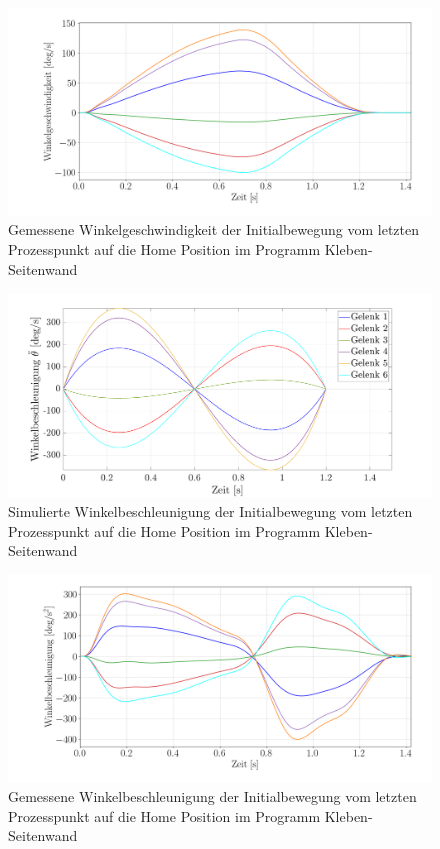 %
\begin{figure}[]
	\centering
	\includegraphics[width=1\linewidth]{images/vel}
	\caption{Gemessene Winkelgeschwindigkeit der Initialbewegung vom letzten Prozesspunkt auf die  Home Position im Programm Kleben-Seitenwand} 
	\label{fig:winkelgeschwindigkeit_py1}
\end{figure}
%
\newpage
\begin{figure}[]
	\centering
	\includegraphics[width=1\linewidth]{images/accmat}
	\caption{Simulierte Winkelbeschleunigung der Initialbewegung vom letzten Prozesspunkt auf die  Home Position im Programm Kleben-Seitenwand}
	\label{fig:winkelbeschleunigung}
\end{figure}
%
\begin{figure}[]
	\centering
	\includegraphics[width=1\linewidth]{images/acc}
	\caption{Gemessene Winkelbeschleunigung  der Initialbewegung vom letzten Prozesspunkt auf die  Home Position im Programm Kleben-Seitenwand}
	\label{fig:winkelbeschleunigung_py}
\end{figure}
